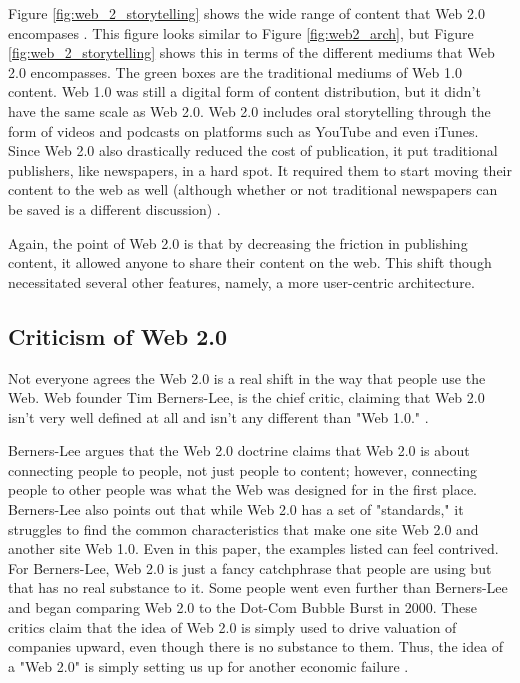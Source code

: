 \documentclass[12pt]{article}
\begin{document}
Figure \ref{fig:web_2_storytelling} shows the wide range of content that Web 2.0 encompases \cite{web_2_storytelling}.  This figure looks similar to Figure \ref{fig:web2_arch}, but Figure \ref{fig:web_2_storytelling} shows this in terms of the different mediums that Web 2.0 encompasses.  The green boxes are the traditional mediums of Web 1.0 content.  Web 1.0 was still a digital form of content distribution, but it didn't have the same scale as Web 2.0.  Web 2.0 includes oral storytelling through the form of videos and podcasts on platforms such as YouTube and even iTunes.  Since Web 2.0 also drastically reduced the cost of publication, it put traditional publishers, like newspapers, in a hard spot.  It required them to start moving their content to the web as well (although whether or not traditional newspapers can be saved is a different discussion) \cite{kennedy_2016}.

Again, the point of Web 2.0 is that by decreasing the friction in publishing content, it allowed anyone to share their content on the web.  This shift though necessitated several other features, namely, a more user-centric architecture.

\subsection{Criticism of Web 2.0}
Not everyone agrees the Web 2.0 is a real shift in the way that people use the Web.  Web founder Tim Berners-Lee, is the chief critic, claiming that Web 2.0 isn't very well defined at all and isn't any different than "Web 1.0." \cite{web_2_criticism}.

Berners-Lee argues that the Web 2.0 doctrine claims that Web 2.0 is about connecting people to people, not just people to content; however, connecting people to other people was what the Web was designed for in the first place.  Berners-Lee also points out that while Web 2.0 has a set of "standards," it struggles to find the common characteristics that make one site Web 2.0 and another site Web 1.0.  Even in this paper, the examples listed can feel contrived.  For Berners-Lee, Web 2.0 is just a fancy catchphrase that people are using but that has no real substance to it.  Some people went even further than Berners-Lee and began comparing Web 2.0 to the Dot-Com Bubble Burst in 2000.  These critics claim that the idea of Web 2.0 is simply used to drive valuation of companies upward, even though there is no substance to them.  Thus, the idea of a "Web 2.0" is simply setting us up for another economic failure \cite{bubble_2}.
\end{document}
